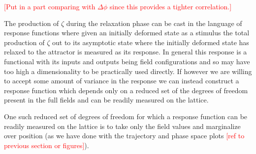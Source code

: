 


\textcolor{red}{[Put in a part comparing with $\Delta\phi$ since this provides a tighter correlation.]}
\Fdeltaps
\Fdeltaphizetacorr


The production of $\zeta$ during the relaxation phase can be cast in the language of response functions where given an initially deformed state as a stimulus the total production of $\zeta$ out to its asymptotic state where the initially deformed state has relaxed to the attractor is measured as its response. In general this response is a functional with its inputs and outputs being field configurations and so may have too high a dimensionality to be practically used directly. If however we are willing to accept some amount of variance in the response we can instead construct a response function which depends only on a reduced set of the degrees of freedom present in the full fields and can be readily measured on the lattice.

One such reduced set of degrees of freedom for which a response function can be readily measured on the lattice is to take only the field values and marginalize over position (as we have done with the trajectory and phase space plots \textcolor{red}{[ref to previous section or figures]}). 

